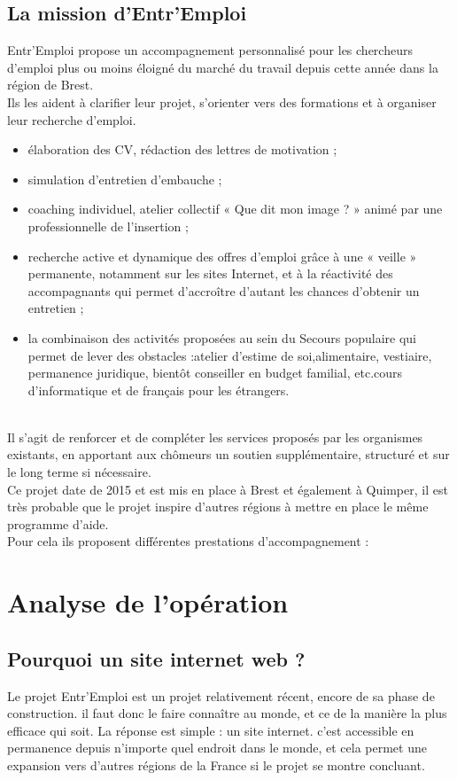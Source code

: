\documentclass[a4paper, 12pt]{report}
\begin{document}
\section{La mission d'Entr'Emploi}
Entr'Emploi propose un accompagnement personnalisé pour les chercheurs d'emploi plus ou moins éloigné du marché du travail depuis cette année dans la région de Brest.\\
Ils les aident à clarifier leur projet, s'orienter vers des formations et à organiser leur recherche d'emploi.\\
\begin{itemize}
\item élaboration des CV, rédaction des lettres de motivation ;
\item simulation d’entretien d’embauche ;
\item coaching individuel, atelier collectif « Que dit mon image ? » animé par une professionnelle de l’insertion ;
\item recherche active et dynamique des offres d’emploi grâce à une « veille » permanente, notamment sur les sites Internet, et à la réactivité des accompagnants qui permet d’accroître d’autant les chances d’obtenir un entretien ;
\item la combinaison des activités proposées au sein du Secours populaire qui permet de lever des obstacles :atelier d’estime de soi,alimentaire, vestiaire, permanence juridique, bientôt conseiller en budget familial, etc.cours d’informatique et de français pour les étrangers.
\end{itemize}
\ \\
Il s'agit de renforcer et de compléter les services proposés par les organismes existants, en apportant aux chômeurs un soutien supplémentaire, structuré et sur le long terme si nécessaire.\\
Ce projet date de 2015 et est mis en place à Brest et également à Quimper, il est très probable que le projet inspire d'autres régions à mettre en place le même programme d'aide.\\
Pour cela ils proposent différentes prestations d’accompagnement :


\chapter{Analyse de l’opération}
\thispagestyle{fancy}
\section{Pourquoi un site internet web ?}
Le projet Entr'Emploi est un projet relativement récent, encore de sa phase de construction. il faut donc le faire
connaître au monde, et ce de la manière la plus efficace qui soit. La réponse est simple : un site internet.
c'est accessible en permanence depuis n'importe quel endroit dans le monde, et cela permet une expansion vers d'autres
régions de la France si le projet se montre concluant.
\end{document}

